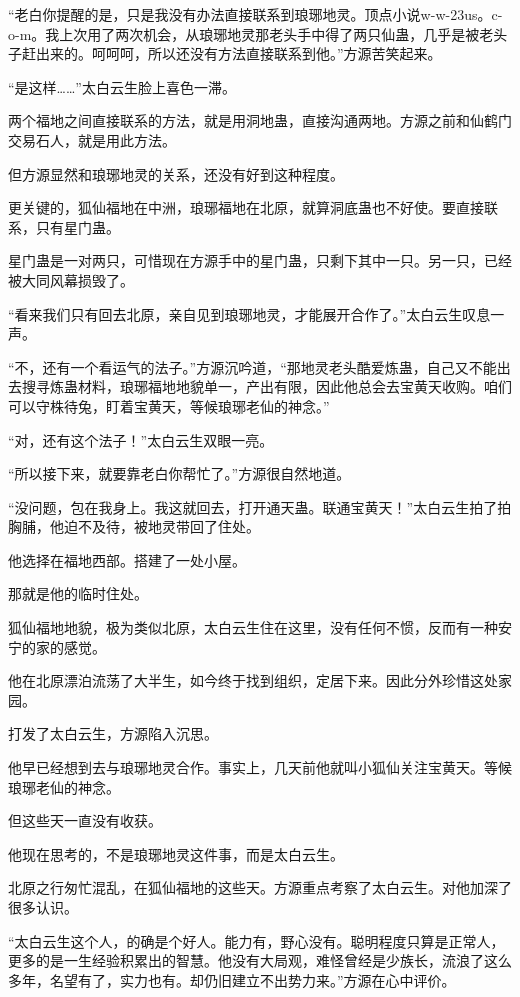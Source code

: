
\begin{this_body}

“老白你提醒的是，只是我没有办法直接联系到琅琊地灵。顶点小说w-w-23us。c-o-m。我上次用了两次机会，从琅琊地灵那老头手中得了两只仙蛊，几乎是被老头子赶出来的。呵呵呵，所以还没有方法直接联系到他。”方源苦笑起来。

“是这样……”太白云生脸上喜色一滞。

两个福地之间直接联系的方法，就是用洞地蛊，直接沟通两地。方源之前和仙鹤门交易石人，就是用此方法。

但方源显然和琅琊地灵的关系，还没有好到这种程度。

更关键的，狐仙福地在中洲，琅琊福地在北原，就算洞底蛊也不好使。要直接联系，只有星门蛊。

星门蛊是一对两只，可惜现在方源手中的星门蛊，只剩下其中一只。另一只，已经被大同风幕损毁了。

“看来我们只有回去北原，亲自见到琅琊地灵，才能展开合作了。”太白云生叹息一声。

“不，还有一个看运气的法子。”方源沉吟道，“那地灵老头酷爱炼蛊，自己又不能出去搜寻炼蛊材料，琅琊福地地貌单一，产出有限，因此他总会去宝黄天收购。咱们可以守株待兔，盯着宝黄天，等候琅琊老仙的神念。”

“对，还有这个法子！”太白云生双眼一亮。

“所以接下来，就要靠老白你帮忙了。”方源很自然地道。

“没问题，包在我身上。我这就回去，打开通天蛊。联通宝黄天！”太白云生拍了拍胸脯，他迫不及待，被地灵带回了住处。

他选择在福地西部。搭建了一处小屋。

那就是他的临时住处。

狐仙福地地貌，极为类似北原，太白云生住在这里，没有任何不惯，反而有一种安宁的家的感觉。

他在北原漂泊流荡了大半生，如今终于找到组织，定居下来。因此分外珍惜这处家园。

打发了太白云生，方源陷入沉思。

他早已经想到去与琅琊地灵合作。事实上，几天前他就叫小狐仙关注宝黄天。等候琅琊老仙的神念。

但这些天一直没有收获。

他现在思考的，不是琅琊地灵这件事，而是太白云生。

北原之行匆忙混乱，在狐仙福地的这些天。方源重点考察了太白云生。对他加深了很多认识。

“太白云生这个人，的确是个好人。能力有，野心没有。聪明程度只算是正常人，更多的是一生经验积累出的智慧。他没有大局观，难怪曾经是少族长，流浪了这么多年，名望有了，实力也有。却仍旧建立不出势力来。”方源在心中评价。


\end{this_body}
